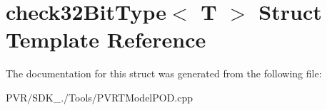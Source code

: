 \hypertarget{structcheck32_bit_type}{\section{check32\+Bit\+Type$<$ T $>$ Struct Template Reference}
\label{structcheck32_bit_type}
}


The documentation for this struct was generated from the following file\+:\begin{DoxyCompactItemize}
\item 
P\+V\+R/\+S\+D\+K\+\_./\+Tools/P\+V\+R\+T\+Model\+P\+O\+D.\+cpp\end{DoxyCompactItemize}
